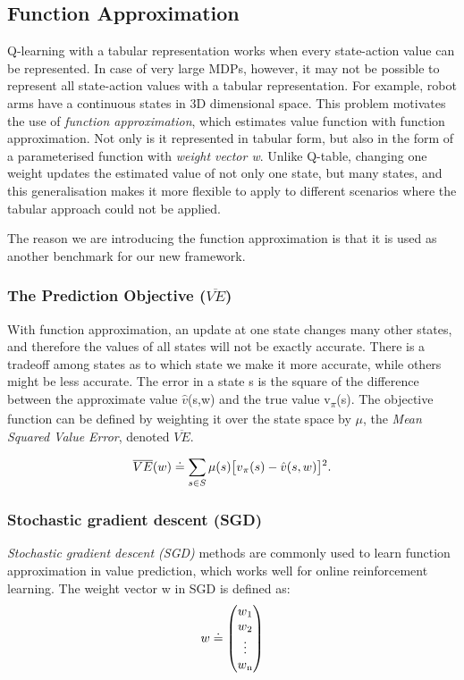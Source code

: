 \documentclass[11pt,twoside]{report}
\theoremstyle{plain}
\theoremstyle{definition}
\begin{document}
\subsection{Function Approximation}
\label{function_approximation}
Q-learning with a tabular representation works when every state-action value can be represented. 
In case of very large MDPs, however, it may not be possible to represent all state-action values with a tabular representation.
For example, robot arms have a continuous states in 3D dimensional space.
This problem motivates the use of \textit{function approximation}, which estimates value function with function approximation.  Not only is it represented in tabular form, but also in the form of a parameterised function with \textit{weight vector w}.
Unlike Q-table, changing one weight updates the estimated value of not only one state, but many states, and this generalisation makes it more flexible to apply to different scenarios where the tabular approach could not be applied.

The reason we are introducing the function approximation is that it is used as another benchmark for our new framework.

\subsubsection{The Prediction Objective ($\overline{VE}$)}
With function approximation, an update at one state changes many other states, and therefore the values of all states will not be exactly accurate.
There is a tradeoff among states as to which state we make it more accurate, while others might be less accurate.
The error in a state s is the square of the difference between the approximate value $\hat{v}$(s,w) and the true value v\textsubscript{$\pi$}(s). The objective function can be defined by weighting it over the state space by $\mu$, the \textit{Mean Squared Value Error}, denoted $\overline{VE}$.

\begin{equation}
\overline{VE}(w) \doteq \sum_{s \in S} \mu (s) \big[ v\textsubscript{$\pi$}(s) - \hat{v}(s,w) \big]\textsuperscript{2}.
\end{equation}
\label{ve}

\subsubsection{Stochastic gradient descent (SGD)}
\textit{Stochastic gradient descent (SGD)} methods are commonly used to learn function approximation in value prediction, which works well for online reinforcement learning.
The weight vector w in SGD is defined as:
\begin{equation}
 w \doteq  \begin{pmatrix}  w\textsubscript{1}  \\ w\textsubscript{2} \\ \vdots \\ w\textsubscript{n}   \end{pmatrix}
\end{equation}
\end{document}
